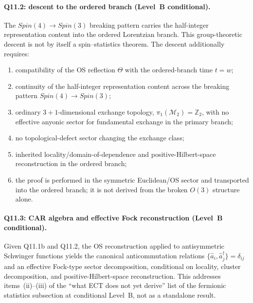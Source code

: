 \paragraph{Q11.2: descent to the ordered branch (Level~B
conditional).}
The $Spin(4)\to Spin(3)$ breaking pattern carries the half-integer
representation content into the ordered Lorentzian branch.
This group-theoretic descent is not by itself a spin--statistics
theorem.
The descent additionally requires:
\begin{enumerate}[label=(\roman*)]
  \item compatibility of the OS reflection $\Theta$ with the
    ordered-branch time $t=w$;
  \item continuity of the half-integer representation content
    across the breaking pattern $Spin(4)\to Spin(3)$;
  \item ordinary $3{+}1$-dimensional exchange topology,
    $\pi_1(\mathcal M_2)=\mathbb Z_2$, with no effective anyonic
    sector for fundamental exchange in the primary branch;
  \item no topological-defect sector changing the exchange class;
  \item inherited locality/domain-of-dependence and
    positive-Hilbert-space reconstruction in the ordered branch;
  \item the proof is performed in the symmetric Euclidean/OS sector
    and transported into the ordered branch; it is not derived from
    the broken $O(3)$ structure alone.
\end{enumerate}


\paragraph{Q11.3: CAR algebra and effective Fock reconstruction
(Level~B conditional).}
Given Q11.1b and Q11.2, the OS reconstruction applied to
antisymmetric Schwinger functions yields the canonical
anticommutation relations
$\{\hat a_i,\hat a_j^{\dagger}\}=\delta_{ij}$ and an effective
Fock-type sector decomposition, conditional on locality, cluster
decomposition, and positive-Hilbert-space reconstruction.
This addresses items~(ii)--(iii) of the ``what ECT does not yet
derive'' list of the fermionic statistics subsection at conditional
Level~B, not as a standalone result.

